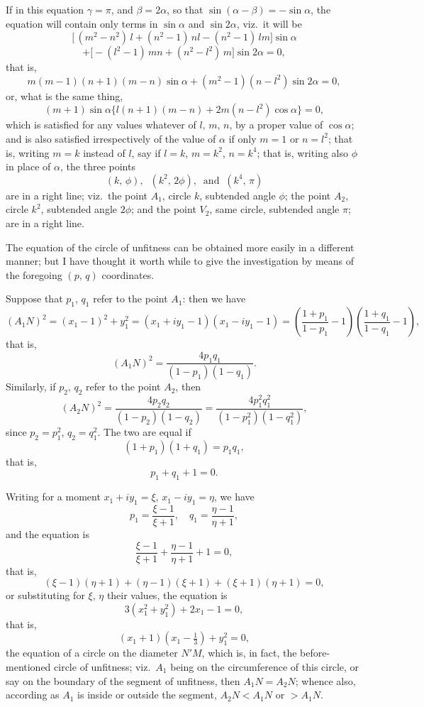 \documentclass[11pt]{article}
\begin{document}
If in this equation $\gamma = \pi$, and $\beta = 2\alpha$, so that $\sin(\alpha - \beta) = -\sin\alpha$, the equation
will contain only terms in $\sin\alpha$ and $\sin 2\alpha$, viz.\ it will be
\[
\bigl[\,(m^2 - n^2)\,l + (n^2 - 1)\,nl - (n^2 - 1)\,lm\bigr]\sin\alpha
\]
\[
+ \bigl[-(l^2 - 1)\,mn + (n^2 - l^2)\,m\bigr]\sin 2\alpha = 0,
\]
that is,
\[
   m(m - 1)(n + 1)(m - n)\sin\alpha + (m^2 - 1)(n - l^2)\sin 2\alpha = 0,
\]
or, what is the same thing,
\[
   (m + 1)\sin\alpha\bigl\{l(n + 1)(m - n) + 2m(n - l^2)\cos\alpha\bigr\} = 0,
\]
which is satisfied for any values whatever of $l,\,m,\,n$, by a proper value of $\cos\alpha$;
and is also satisfied irrespectively of the value of $\alpha$ if only $m = 1$ or $n = l^2$; that is, writing
$m = k$ instead of $l$, say if $l = k$, $m = k^2$, $n = k^4$; that is, writing also $\phi$ in place of $\alpha$, the
three points
\[
   (k,\,\phi),\;\;(k^2,\,2\phi),\;\;\text{and}\;\;(k^4,\,\pi)
\]
are in a right line; viz.\ the point $A_1$, circle $k$, subtended angle $\phi$; the point $A_2$,
circle $k^2$, subtended angle $2\phi$; and the point $V_2$, same circle, subtended angle $\pi$;
are in a right line.

\bigskip

The equation of the circle of unfitness can be obtained more easily in a different
manner; but I have thought it worth while to give the investigation by means of
the foregoing $(p,\,q)$ coordinates.

Suppose that $p_1,\,q_1$ refer to the point $A_1$: then we have
\[
   (A_1 N)^2 = (x_1 - 1)^2 + y_1^2 = (x_1 + iy_1 - 1)(x_1 - iy_1 - 1) = \left(\frac{1+p_1}{1-p_1} - 1\right)\left(\frac{1+q_1}{1-q_1} - 1\right),
\]
that is,
\[
   (A_1 N)^2 = \frac{4 p_1 q_1}{(1 - p_1)(1 - q_1)}.
\]
Similarly, if $p_2,\,q_2$ refer to the point $A_2$, then
\[
   (A_2 N)^2 = \frac{4 p_2 q_2}{(1 - p_2)(1 - q_2)} = \frac{4 p_1^2 q_1^2}{(1 - p_1^2)(1 - q_1^2)},
\]
since $p_2 = p_1^2$, $q_2 = q_1^2$. The two are equal if
\[
   (1 + p_1)(1 + q_1) = p_1 q_1,
\]
that is,
\[
   p_1 + q_1 + 1 = 0.
\]

Writing for a moment $x_1 + iy_1 = \xi$, $x_1 - iy_1 = \eta$, we have
\[
   p_1 = \frac{\xi - 1}{\xi + 1},\quad q_1 = \frac{\eta - 1}{\eta + 1},
\]
and the equation is
\[
   \frac{\xi - 1}{\xi + 1} + \frac{\eta - 1}{\eta + 1} + 1 = 0,
\]
that is,
\[
   (\xi - 1)(\eta + 1) + (\eta - 1)(\xi + 1) + (\xi + 1)(\eta + 1) = 0,
\]
or substituting for $\xi,\,\eta$ their values, the equation is
\[
   3(x_1^2 + y_1^2) + 2x_1 - 1 = 0,
\]
that is,
\[
   (x_1 + 1)(x_1 - \tfrac{1}{3}) + y_1^2 = 0,
\]
the equation of a circle on the diameter $N'M$, which is, in fact, the before-mentioned
circle of unfitness; viz.\ $A_1$ being on the circumference of this circle, or say on the
boundary of the segment of unfitness, then $A_1 N = A_2 N$; whence also, according as
$A_1$ is inside or outside the segment, $A_2 N < A_1 N$ or $> A_1 N$.
\end{document}
